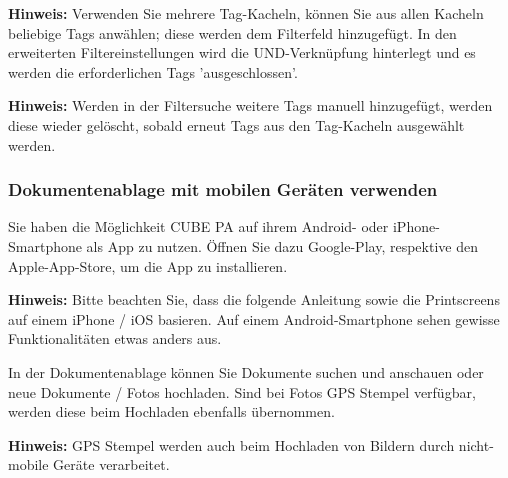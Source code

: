 \textbf{Hinweis:} Verwenden Sie mehrere Tag-Kacheln, können Sie aus allen Kacheln beliebige Tags anwählen; diese werden dem Filterfeld  hinzugefügt. In den erweiterten Filtereinstellungen  wird die UND-Verknüpfung  hinterlegt und es werden die erforderlichen Tags 'ausgeschlossen'.

\vspace{\baselineskip}

\textbf{Hinweis:} Werden in der Filtersuche weitere Tags manuell hinzugefügt, werden diese wieder gelöscht, sobald erneut Tags aus den Tag-Kacheln ausgewählt werden.

\subsubsection{Dokumentenablage mit mobilen Geräten verwenden}

Sie haben die Möglichkeit CUBE PA auf ihrem Android- oder iPhone-Smartphone als App zu nutzen. Öffnen Sie dazu Google-Play, respektive den Apple-App-Store, um die App zu installieren.

\vspace{\baselineskip}

\textbf{Hinweis:} Bitte beachten Sie, dass die folgende Anleitung sowie die Printscreens auf einem iPhone / iOS basieren. Auf einem Android-Smartphone sehen gewisse Funktionalitäten etwas anders aus.

\vspace{\baselineskip}

In der Dokumentenablage können Sie Dokumente suchen und anschauen oder neue Dokumente / Fotos hochladen. Sind bei Fotos GPS Stempel verfügbar, werden diese beim Hochladen ebenfalls übernommen. 

\vspace{\baselineskip}

\textbf{Hinweis:} GPS Stempel werden auch beim Hochladen von Bildern durch nicht-mobile Geräte verarbeitet.

\pagebreak

